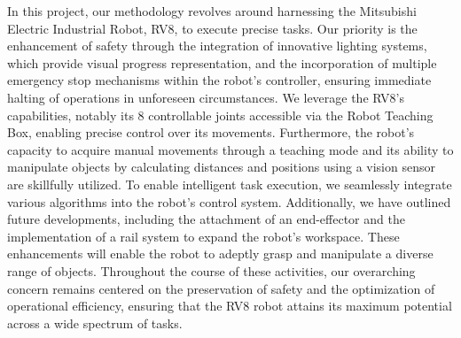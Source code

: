 In this project, our methodology revolves around harnessing the Mitsubishi Electric Industrial Robot, RV8, to execute precise tasks. Our priority is the enhancement of safety through the integration of innovative lighting systems, which provide visual progress representation, and the incorporation of multiple emergency stop mechanisms within the robot's controller, ensuring immediate halting of operations in unforeseen circumstances. We leverage the RV8's capabilities, notably its 8 controllable joints accessible via the Robot Teaching Box, enabling precise control over its movements. Furthermore, the robot's capacity to acquire manual movements through a teaching mode and its ability to manipulate objects by calculating distances and positions using a vision sensor are skillfully utilized. To enable intelligent task execution, we seamlessly integrate various algorithms into the robot's control system. Additionally, we have outlined future developments, including the attachment of an end-effector and the implementation of a rail system to expand the robot's workspace. These enhancements will enable the robot to adeptly grasp and manipulate a diverse range of objects. Throughout the course of these activities, our overarching concern remains centered on the preservation of safety and the optimization of operational efficiency, ensuring that the RV8 robot attains its maximum potential across a wide spectrum of tasks.